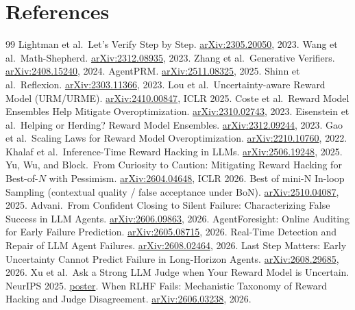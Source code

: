 \documentclass[11pt]{article}
\newcommand{\arx}[1]{\href{https://arxiv.org/abs/#1}{arXiv:#1}}
\begin{document}
\section*{References}
\begingroup\footnotesize
\begin{thebibliography}{99}
 Lightman et al.\ Let's Verify Step by Step. \arx{2305.20050}, 2023.
 Wang et al.\ Math-Shepherd. \arx{2312.08935}, 2023.
 Zhang et al.\ Generative Verifiers. \arx{2408.15240}, 2024.
 AgentPRM. \arx{2511.08325}, 2025.
 Shinn et al.\ Reflexion. \arx{2303.11366}, 2023.
 Lou et al.\ Uncertainty-aware Reward Model (URM/URME). \arx{2410.00847}, ICLR 2025.
 Coste et al.\ Reward Model Ensembles Help Mitigate Overoptimization. \arx{2310.02743}, 2023.
 Eisenstein et al.\ Helping or Herding? Reward Model Ensembles. \arx{2312.09244}, 2023.
 Gao et al.\ Scaling Laws for Reward Model Overoptimization. \arx{2210.10760}, 2022.
 Khalaf et al.\ Inference-Time Reward Hacking in LLMs. \arx{2506.19248}, 2025.
 Yu, Wu, and Block.\ From Curiosity to Caution: Mitigating Reward Hacking for Best-of-$N$ with Pessimism. \arx{2604.04648}, ICLR 2026.
 Best of mini-N In-loop Sampling (contextual quality / false acceptance under BoN). \arx{2510.04087}, 2025.
 Advani.\ From Confident Closing to Silent Failure: Characterizing False Success in LLM Agents. \arx{2606.09863}, 2026.
 AgentForesight: Online Auditing for Early Failure Prediction. \arx{2605.08715}, 2026.
 Real-Time Detection and Repair of LLM Agent Failures. \arx{2608.02464}, 2026.
 Last Step Matters: Early Uncertainty Cannot Predict Failure in Long-Horizon Agents. \arx{2608.29685}, 2026.
 Xu et al.\ Ask a Strong LLM Judge when Your Reward Model is Uncertain. NeurIPS 2025.
  \href{https://neurips.cc/virtual/2025/poster/117907}{poster}.
 When RLHF Fails: Mechanistic Taxonomy of Reward Hacking and Judge Disagreement. \arx{2606.03238}, 2026.
\end{thebibliography}
\endgroup
\end{document}
